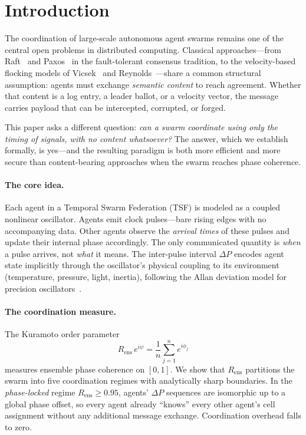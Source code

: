 \documentclass[twocolumn,10pt]{article}
\newcommand{\Rens}{R_{\mathrm{ens}}}
\newcommand{\DeltaP}{\Delta P}
\begin{document}
\section{Introduction}
\label{sec:introduction}

The coordination of large-scale autonomous agent swarms remains one of the
central open problems in distributed computing. Classical approaches---from
Raft~\cite{Ongaro2014} and Paxos~\cite{Lamport1998} in the fault-tolerant
consensus tradition, to the velocity-based flocking models of
Vicsek~\cite{Vicsek1995} and Reynolds~\cite{Reynolds1987}---share a common
structural assumption: agents must exchange \emph{semantic content} to reach
agreement. Whether that content is a log entry, a leader ballot, or a velocity
vector, the message carries payload that can be intercepted, corrupted, or
forged.

This paper asks a different question: \emph{can a swarm coordinate using
only the timing of signals, with no content whatsoever?} The answer, which
we establish formally, is yes---and the resulting paradigm is both more
efficient and more secure than content-bearing approaches when the swarm
reaches phase coherence.

\paragraph{The core idea.}
Each agent in a Temporal Swarm Federation (TSF) is modeled as a coupled
nonlinear oscillator. Agents emit clock pulses---bare rising edges with no
accompanying data. Other agents observe the \emph{arrival times} of these
pulses and update their internal phase accordingly. The only communicated
quantity is \emph{when} a pulse arrives, not \emph{what} it means. The
inter-pulse interval $\DeltaP$ encodes agent state implicitly through the
oscillator's physical coupling to its environment (temperature, pressure,
light, inertia), following the Allan deviation model for precision
oscillators~\cite{IEEE1588-2019}.

\paragraph{The coordination measure.}
The Kuramoto order parameter~\cite{Kuramoto1984,Strogatz2000}
\[
   \Rens \, e^{i\psi} = \frac{1}{n} \sum_{j=1}^{n} e^{i\phi_j}
\]
measures ensemble phase coherence on $[0,1]$. We show that $\Rens$ partitions
the swarm into five coordination regimes with analytically sharp boundaries.
In the \emph{phase-locked} regime $\Rens \geq 0.95$, agents' $\DeltaP$
sequences are isomorphic up to a global phase offset, so every agent already
``knows'' every other agent's cell assignment without any additional message
exchange. Coordination overhead falls to zero.
\end{document}
